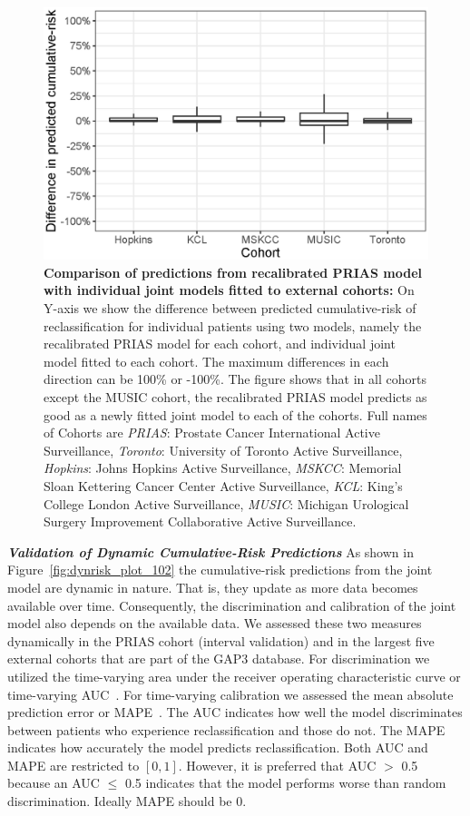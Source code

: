 \begin{figure}[!htb]
\centerline{\includegraphics[width=0.85\columnwidth]{images/calib_insmall_after.eps}}
\caption{\textbf{Comparison of predictions from recalibrated PRIAS model with individual joint models fitted to external cohorts:} On Y-axis we show the difference between predicted cumulative-risk of reclassification for individual patients using two models, namely the recalibrated PRIAS model for each cohort, and individual joint model fitted to each cohort. The maximum differences in each direction can be 100\% or -100\%. The figure shows that in all cohorts except the MUSIC cohort, the recalibrated PRIAS model predicts as good as a newly fitted joint model to each of the cohorts. Full names of Cohorts are \textit{PRIAS}: Prostate Cancer International Active Surveillance, \textit{Toronto}: University of Toronto Active Surveillance, \textit{Hopkins}: Johns Hopkins Active Surveillance, \textit{MSKCC}: Memorial Sloan Kettering Cancer Center Active Surveillance, \textit{KCL}: King's College London Active Surveillance, \textit{MUSIC}: Michigan Urological Surgery Improvement Collaborative Active Surveillance.}
\label{fig:calib_insmall_after}
\end{figure}

\clearpage
\textbf{\textit{Validation of Dynamic Cumulative-Risk Predictions}}
As shown in Figure~\ref{fig:dynrisk_plot_102} the cumulative-risk predictions from the joint model are dynamic in nature. That is, they update as more data becomes available over time. Consequently, the discrimination and calibration of the joint model also depends on the available data. We assessed these two measures dynamically in the PRIAS cohort (interval validation) and in the largest five external cohorts that are part of the GAP3 database. For discrimination we utilized the time-varying area under the receiver operating characteristic curve or time-varying AUC~\citep{rizopoulos2017dynamic}. For time-varying calibration we assessed the mean absolute prediction error or MAPE~\citep{rizopoulos2017dynamic}. The AUC indicates how well the model discriminates between patients who experience reclassification and those do not. The MAPE indicates how accurately the model predicts reclassification. Both AUC and MAPE are restricted to $[0,1]$. However, it is preferred that AUC $>$ 0.5 because an AUC $\leq$ 0.5 indicates that the model performs worse than random discrimination. Ideally MAPE should be 0.


